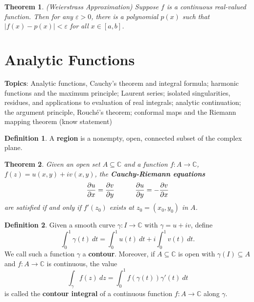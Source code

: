 \documentclass[11pt]{amsart}
\newtheorem*{theorem*}{Theorem}
\theoremstyle{definition}
\newtheorem*{definition*}{Definition}
\renewcommand\:{\colon}
\newcommand{\C}{\mathds{C}}
\begin{document}
\begin{theorem*}
	\textnormal{(Weierstrass Approximation)} Suppose $f$ is a continuous real-valued function. Then for any $\varepsilon > 0$, there is a polynomial $p(x)$ such that $|f(x) - p(x)| < \varepsilon$ for all $x \in [a,b]$.
\end{theorem*}




\clearpage












\section{Analytic Functions}

\noindent \textbf{Topics}: Analytic functions, Cauchy's theorem and integral formula; harmonic functions and the maximum principle; Laurent series; isolated singularities, residues, and applications to evaluation of real integrals; analytic continuation; the argument principle, Rouch\'e's theorem; conformal maps and the Riemann mapping theorem (know statement)
\vskip40pt


\begin{definition*}
	A \textbf{region} is a nonempty, open, connected subset of the complex plane.
\end{definition*}

\begin{theorem*}
	Given an open set $A \subseteq \C$ and a function $f\: A \to \C$, $f(z) = u(x,y) + iv(x,y)$, the \textbf{Cauchy-Riemann equations}
		\[ \frac{\partial u}{\partial x} = \frac{\partial v}{\partial y} \hskip30pt \frac{\partial u}{\partial y} = -\frac{\partial v}{\partial x} \]
	are satisfied if and only if $f'(z_0)$ exists at $z_0 = (x_0, y_0)$ in $A$.
\end{theorem*}
\vskip40pt



\begin{definition*}
	Given a smooth curve $\gamma\: I \to \C$ with $\gamma = u + iv$, define
		\[ \int_0^1 \gamma(t) \ dt = \int_0^1 u(t) \ dt + i \int_0^1 v(t) \ dt. \]
	We call such a function $\gamma$ a \textbf{contour}. Moreover, if $A \subseteq \C$ is open with $\gamma(I) \subseteq A$ and $f\: A \to \C$ is continuous, the value
		\[ \int_\gamma f(z) \ dz = \int_0^1 f(\gamma(t)) \gamma'(t) \ dt \]
	is called the \textbf{contour integral} of a continuous function $f\: A \to \C$ along $\gamma$.
\end{definition*}
\end{document}
